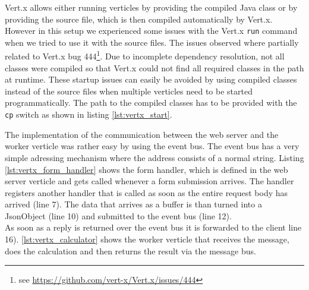 

Vert.x allows either running verticles by providing the compiled Java class or by providing the
source file, which is then compiled automatically by Vert.x. However in this
setup we experienced some issues with the Vert.x \texttt{run} command when we tried to
use it with the source files. The issues observed where partially related to
Vert.x bug 444\footnote{see \url{https://github.com/vert-x/Vert.x/issues/444}}.
Due to incomplete dependency resolution, not all classes were compiled so that
Vert.x could not find all required classes in the path at runtime.
These startup issues can easily be avoided by using compiled classes instead of
the source files when multiple verticles need to be started programmatically.
The path to the compiled classes has to be provided with the \texttt{cp} switch as
shown in listing \ref{lst:vertx_start}.

\clearpage





The implementation of the communication between the web server and the worker
verticle was rather easy by using the event bus. The event bus has a very
simple adressing mechanism where the address consists of a normal string.
Listing \ref{lst:vertx_form_handler} shows the form handler, which is defined
in the web server verticle and gets called whenever a form submission arrives.
The handler registers another handler that is called as soon as the entire
request body has arrived (line 7). The data that arrives as a buffer is than
turned into a JsonObject (line 10) and submitted to the event bus (line 12).\\
As soon as a reply is returned over the event bus it is forwarded to the client line 16).
\autoref{lst:vertx_calculator} shows the worker verticle that receives
the message, does the calculation and then returns the result via the message bus.

